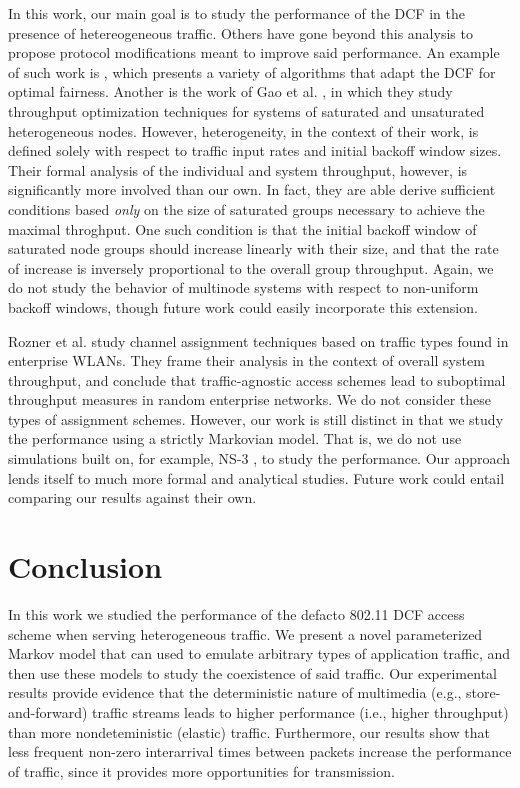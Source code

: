 \documentclass{llncs}
\begin{document}
In this work, our main goal is to study the performance of the DCF in the presence of hetereogeneous traffic. Others have gone beyond this analysis to propose protocol modifications meant to improve said performance. An example of such work is \cite{li2008predictable}, which presents a variety of algorithms that adapt the DCF for optimal fairness. Another is the work of Gao et al. \cite{gao2013throughput}, in which they study throughput optimization techniques for systems of saturated and unsaturated heterogeneous nodes. However, heterogeneity, in the context of their work, is defined solely with respect to traffic input rates and initial backoff window sizes. Their formal analysis of the individual and system throughput, however, is significantly more involved than our own. In fact, they are able derive sufficient conditions based \emph{only} on the size of saturated groups necessary to achieve the maximal throghput. One such condition is that the initial backoff window of saturated node groups should increase linearly with their size, and that the rate of increase is inversely proportional to the overall group throughput. Again, we do not study the behavior of multinode systems with respect to non-uniform backoff windows, though future work could easily incorporate this extension.

Rozner et al. \cite{rozner2007traffic} study channel assignment techniques based on traffic types found in enterprise WLANs. They frame their analysis in the context of overall system throughput, and conclude that traffic-agnostic access schemes lead to suboptimal throughput measures in random enterprise networks. We do not consider these types of assignment schemes. However, our work is still distinct in that we study the performance using a strictly Markovian model. That is, we do not use simulations built on, for example, NS-3 \cite{henderson2008network}, to study the performance. Our approach lends itself to much more formal and analytical studies. Future work could entail comparing our results against their own.

\section{Conclusion}
In this work we studied the performance of the defacto 802.11 DCF access scheme when serving heterogeneous traffic. We present a novel parameterized Markov model that can used to emulate arbitrary types of application traffic, and then use these models to study the coexistence of said traffic. Our experimental results provide evidence that the deterministic nature of multimedia (e.g., store-and-forward) traffic streams leads to higher performance (i.e., higher throughput) than more nondeteministic (elastic) traffic. Furthermore, our results show that less frequent non-zero interarrival times between packets increase the performance of traffic, since it provides more opportunities for transmission.




\end{document}
